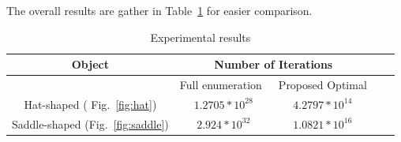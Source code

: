 \documentclass[conference]{IEEEtran}
\begin{document}
The overall results are gather in Table~\ref{table:results} for easier comparison.
\begin{table}
\centering
\caption{Experimental results}
\begin{tabular}{ | c || c | c | c | c | }
 \hline
  Object  & \multicolumn{2}{|c|}{Number of Iterations} \\
 \hline
  						& Full enumeration~\cite{Yang2020Cellular}  &  Proposed Optimal \\
 \hline
 Hat-shaped ( Fig.~\ref{fig:hat})   	& $1.2705*10^{28}$    				&   $4.2797*10^{14}$\\
 \hline
 Saddle-shaped (Fig.~\ref{fig:saddle})					&   $2.924*10^{32}$  		&   	$1.0821*10^{16}$\\
 \hline
\end{tabular}
\label{table:results}
\end{table}


\end{document}
